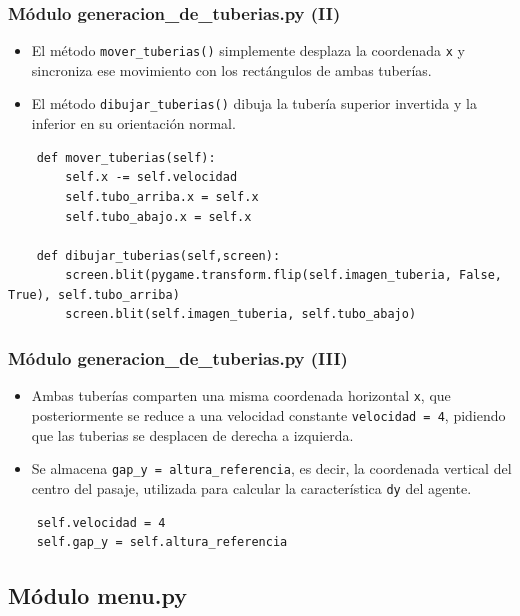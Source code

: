\documentclass[
	11pt, %
]{beamer}
\begin{document}
\begin{frame}[fragile]
\frametitle{Módulo generacion\_de\_tuberias.py (II)}

\begin{itemize}
     \item El método \texttt{mover\_tuberias()} simplemente desplaza la coordenada \texttt{x} y sincroniza ese movimiento con los rectángulos de ambas tuberías.
    \item El método \texttt{dibujar\_tuberias()} dibuja la tubería superior invertida y la inferior en su orientación normal.
\end{itemize}

{\scriptsize
\begin{verbatim}
    def mover_tuberias(self):
        self.x -= self.velocidad
        self.tubo_arriba.x = self.x
        self.tubo_abajo.x = self.x

    def dibujar_tuberias(self,screen):
        screen.blit(pygame.transform.flip(self.imagen_tuberia, False, True), self.tubo_arriba)
        screen.blit(self.imagen_tuberia, self.tubo_abajo)

\end{verbatim}
}
\end{frame}


\begin{frame}[fragile]
\frametitle{Módulo generacion\_de\_tuberias.py (III)}

\begin{itemize}
    \item Ambas tuberías comparten una misma coordenada horizontal \texttt{x},
    que posteriormente se reduce a una velocidad constante \texttt{velocidad = 4},
    pidiendo que las tuberias se desplacen de derecha a izquierda.
    \item Se almacena \texttt{gap\_y = altura\_referencia}, es decir,
    la coordenada vertical del centro del pasaje,
    utilizada para calcular la característica \texttt{dy} del agente.
\end{itemize}

{\scriptsize
\begin{verbatim}
    self.velocidad = 4
    self.gap_y = self.altura_referencia
\end{verbatim}
}
\end{frame}


\subsection{Módulo menu.py}
\end{document}
